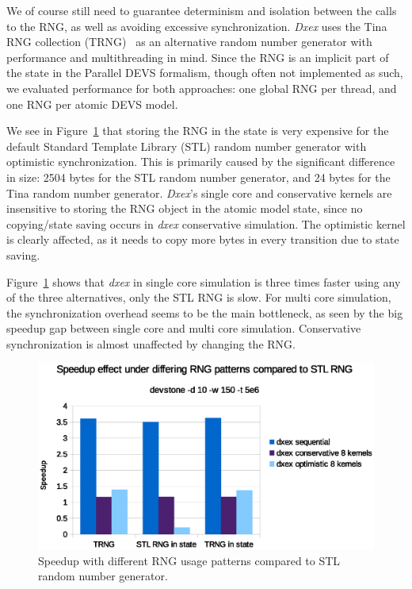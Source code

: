 We of course still need to guarantee determinism and isolation between the calls to the RNG, as well as avoiding excessive synchronization.
\textit{Dxex} uses the Tina RNG collection (TRNG)~\cite{PhysRevE.75.066701} as an alternative random number generator with performance and multithreading in mind.
Since the RNG is an implicit part of the state in the \textsf{Parallel DEVS} formalism, though often not implemented as such, we evaluated performance for both approaches: one global RNG per thread, and one RNG per atomic \textsf{DEVS} model.

We see in Figure~\ref{fig:Queuerngspeedup} that storing the RNG in the state is very expensive for the default Standard Template Library (STL) random number generator with optimistic synchronization.
This is primarily caused by the significant difference in size: 2504 bytes for the STL random number generator, and 24 bytes for the Tina random number generator.
\textit{Dxex}'s single core and conservative kernels are insensitive to storing the RNG object in the atomic model state, since no copying/state saving occurs in \textit{dxex} conservative simulation.
The optimistic kernel is clearly affected, as it needs to copy more bytes in every transition due to state saving.

Figure~\ref{fig:Queuerngspeedup} shows that \textit{dxex} in single core simulation is three times faster using any of the three alternatives, only the STL RNG is slow.
For multi core simulation, the synchronization overhead seems to be the main bottleneck, as seen by the big speedup gap between single core and multi core simulation.
Conservative synchronization is almost unaffected by changing the RNG.

\begin{figure}
    \center
    \includegraphics[width=\columnwidth]{fig/rngspeedupeffectdevstone.eps}
    \caption{Speedup with different RNG usage patterns compared to STL random number generator.}
    \label{fig:Queuerngspeedup}
\end{figure}
